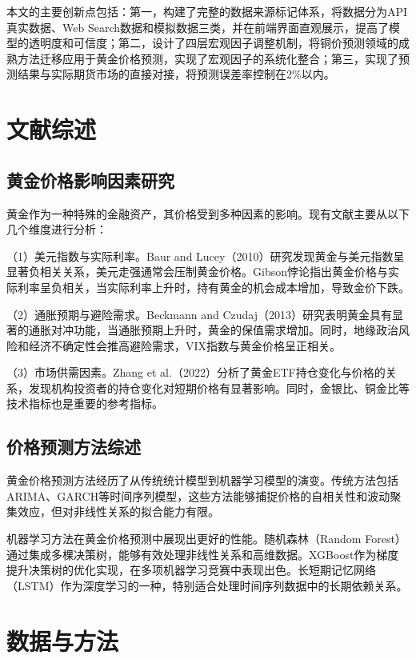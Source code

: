 \documentclass[UTF8,a4paper,12pt]{ctexart}
\begin{document}
本文的主要创新点包括：第一，构建了完整的数据来源标记体系，将数据分为API真实数据、Web Search数据和模拟数据三类，并在前端界面直观展示，提高了模型的透明度和可信度；第二，设计了四层宏观因子调整机制，将铜价预测领域的成熟方法迁移应用于黄金价格预测，实现了宏观因子的系统化整合；第三，实现了预测结果与实际期货市场的直接对接，将预测误差率控制在2\%以内。

\section{文献综述}

\subsection{黄金价格影响因素研究}

黄金作为一种特殊的金融资产，其价格受到多种因素的影响。现有文献主要从以下几个维度进行分析：

（1）美元指数与实际利率。Baur and Lucey（2010）研究发现黄金与美元指数呈显著负相关关系，美元走强通常会压制黄金价格。Gibson悖论指出黄金价格与实际利率呈负相关，当实际利率上升时，持有黄金的机会成本增加，导致金价下跌。

（2）通胀预期与避险需求。Beckmann and Czudaj（2013）研究表明黄金具有显著的通胀对冲功能，当通胀预期上升时，黄金的保值需求增加。同时，地缘政治风险和经济不确定性会推高避险需求，VIX指数与黄金价格呈正相关。

（3）市场供需因素。Zhang et al.（2022）分析了黄金ETF持仓变化与价格的关系，发现机构投资者的持仓变化对短期价格有显著影响。同时，金银比、铜金比等技术指标也是重要的参考指标。

\subsection{价格预测方法综述}

黄金价格预测方法经历了从传统统计模型到机器学习模型的演变。传统方法包括ARIMA、GARCH等时间序列模型，这些方法能够捕捉价格的自相关性和波动聚集效应，但对非线性关系的拟合能力有限。

机器学习方法在黄金价格预测中展现出更好的性能。随机森林（Random Forest）通过集成多棵决策树，能够有效处理非线性关系和高维数据。XGBoost作为梯度提升决策树的优化实现，在多项机器学习竞赛中表现出色。长短期记忆网络（LSTM）作为深度学习的一种，特别适合处理时间序列数据中的长期依赖关系。

\section{数据与方法}
\end{document}
